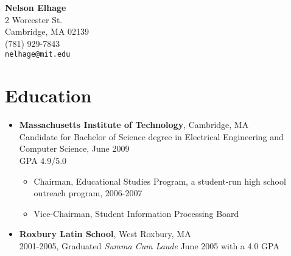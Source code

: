 \documentclass[letterpaper,10pt]{article}
\begin{document}
\begin{center}
  {\LARGE \bf Nelson Elhage}\\
  {\large
    2 Worcester St. \\
    Cambridge, MA 02139 \\
    (781) 929-7843 \\
    \mbox{\small \tt nelhage@mit.edu}}
\end{center}

\section*{Education}
\vspace*{-0.2cm}
\begin{itemize}
  \item \textbf{Massachusetts Institute of Technology}, Cambridge, MA
    \\ Candidate for Bachelor of Science degree in Electrical
    Engineering and Computer Science, June 2009 \\
    GPA 4.9/5.0
    \vspace*{-0.2cm}
    \begin{itemize}
      \item Chairman, Educational Studies Program, a student-run
        high school outreach program, 2006-2007
      \item Vice-Chairman, Student Information Processing Board
    \end{itemize}
  \item \textbf{Roxbury Latin School}, West Roxbury, MA \\ 2001-2005,
    Graduated {\em Summa Cum Laude} June 2005 with a 4.0 GPA
\end{itemize}

\vspace*{-0.7cm}
\end{document}

